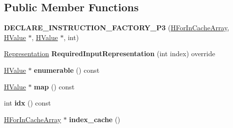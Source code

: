 \subsection*{Public Member Functions}
\begin{DoxyCompactItemize}
\item 
{\bfseries D\+E\+C\+L\+A\+R\+E\+\_\+\+I\+N\+S\+T\+R\+U\+C\+T\+I\+O\+N\+\_\+\+F\+A\+C\+T\+O\+R\+Y\+\_\+\+P3} (\hyperlink{classv8_1_1internal_1_1_h_for_in_cache_array}{H\+For\+In\+Cache\+Array}, \hyperlink{classv8_1_1internal_1_1_h_value}{H\+Value} $\ast$, \hyperlink{classv8_1_1internal_1_1_h_value}{H\+Value} $\ast$, int)\hypertarget{classv8_1_1internal_1_1_h_for_in_cache_array_ad3629898868982142d6198c9d53f8a77}{}\label{classv8_1_1internal_1_1_h_for_in_cache_array_ad3629898868982142d6198c9d53f8a77}

\item 
\hyperlink{classv8_1_1internal_1_1_representation}{Representation} {\bfseries Required\+Input\+Representation} (int index) override\hypertarget{classv8_1_1internal_1_1_h_for_in_cache_array_aa9ab487b8e8c1a174f1633f150c8e38a}{}\label{classv8_1_1internal_1_1_h_for_in_cache_array_aa9ab487b8e8c1a174f1633f150c8e38a}

\item 
\hyperlink{classv8_1_1internal_1_1_h_value}{H\+Value} $\ast$ {\bfseries enumerable} () const \hypertarget{classv8_1_1internal_1_1_h_for_in_cache_array_a856be950472f0217e78330b741fbff75}{}\label{classv8_1_1internal_1_1_h_for_in_cache_array_a856be950472f0217e78330b741fbff75}

\item 
\hyperlink{classv8_1_1internal_1_1_h_value}{H\+Value} $\ast$ {\bfseries map} () const \hypertarget{classv8_1_1internal_1_1_h_for_in_cache_array_a476bbaf30e86078d21de2dc1800a0c11}{}\label{classv8_1_1internal_1_1_h_for_in_cache_array_a476bbaf30e86078d21de2dc1800a0c11}

\item 
int {\bfseries idx} () const \hypertarget{classv8_1_1internal_1_1_h_for_in_cache_array_a8a931356a494a39e5021dc3b2d4b6413}{}\label{classv8_1_1internal_1_1_h_for_in_cache_array_a8a931356a494a39e5021dc3b2d4b6413}

\item 
\hyperlink{classv8_1_1internal_1_1_h_for_in_cache_array}{H\+For\+In\+Cache\+Array} $\ast$ {\bfseries index\+\_\+cache} ()\hypertarget{classv8_1_1internal_1_1_h_for_in_cache_array_a5e4fc08c74aee982da3c3dde2a5a2b5f}{}\label{classv8_1_1internal_1_1_h_for_in_cache_array_a5e4fc08c74aee982da3c3dde2a5a2b5f}


\end{DoxyCompactItemize}
